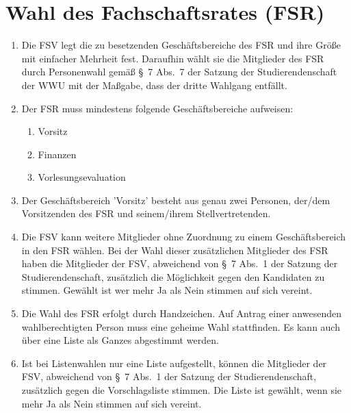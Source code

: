 \section{Wahl des Fachschaftsrates (FSR)}
\begin{enumerate}
	\item \label{abs:wahl1} Die FSV legt die zu besetzenden Geschäftsbereiche des FSR und ihre Größe mit einfacher Mehrheit fest. Daraufhin wählt sie die Mitglieder des FSR durch Personenwahl gemäß §~7 Abs.~7 der Satzung der Studierendenschaft der WWU mit der Maßgabe, dass der dritte Wahlgang entfällt.
	\item \label{abs:geschaeftsbereiche} Der FSR muss mindestens folgende Geschäftsbereiche aufweisen:
	\begin{enumerate}
		\item Vorsitz
		\item Finanzen
		\item Vorlesungsevaluation
	\end{enumerate}
	\item Der Geschäftsbereich 'Vorsitz' besteht aus genau zwei Personen, der/dem Vorsitzenden des FSR und seinem/ihrem Stellvertretenden.
	\item Die FSV kann weitere Mitglieder ohne Zuordnung zu einem Geschäftsbereich in den FSR wählen. Bei der Wahl dieser zusätzlichen Mitglieder des FSR haben die Mitglieder der FSV, abweichend von §~7 Abs.~1 der Satzung der Studierendenschaft, zusätzlich die Möglichkeit gegen den Kandidaten zu stimmen. Gewählt ist wer mehr Ja als Nein stimmen auf sich vereint.
	\item Die Wahl des FSR erfolgt durch Handzeichen.
		Auf Antrag einer anwesenden wahlberechtigten Person muss eine geheime Wahl stattfinden.
		Es kann auch über eine Liste als Ganzes abgestimmt werden.
	\item Ist bei Listenwahlen nur eine Liste aufgestellt, können die Mitglieder der FSV, abweichend von §~7 Abs.~1 der Satzung der Studierendenschaft, zusätzlich gegen die Vorschlagsliste stimmen.
	Die Liste ist gewählt, wenn sie mehr Ja als Nein stimmen auf sich vereint.
\end{enumerate}

